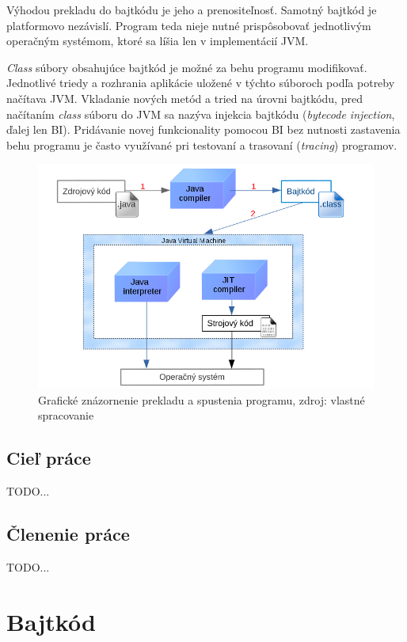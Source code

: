 \documentclass[11pt,final,oneside]{fithesis}
\begin{document}
Výhodou prekladu do bajtkódu je jeho a prenositeľnosť. Samotný bajtkód je
platformovo nezávislí. Program teda nieje nutné prispôsobovať jednotlivým
operačným systémom, ktoré sa líšia len v implementácií JVM.

\textit{Class} súbory obsahujúce bajtkód je možné za behu programu modifikovať.
Jednotlivé triedy a rozhrania aplikácie uložené v týchto súboroch podľa potreby
načítava JVM. Vkladanie nových metód a tried na úrovni bajtkódu, pred
načítaním \textit{class} súboru do JVM sa nazýva injekcia bajtkódu
(\textit{bytecode injection}, ďalej len BI). Pridávanie novej funkcionality
pomocou BI bez nutnosti zastavenia behu programu je často využívané pri
testovaní a trasovaní (\textit{tracing}) programov.

\begin{figure}[h]
  \centering
   \includegraphics[width=\textwidth]{JVM.png}
  \caption{Grafické znázornenie prekladu a spustenia programu, zdroj: vlastné
  spracovanie}
  \label{fig:jvm}
\end{figure}

\section{Cieľ práce}
TODO...

\section{Členenie práce}
TODO...

\chapter{Bajtkód}
\label{chap:bytecode}
\end{document}
